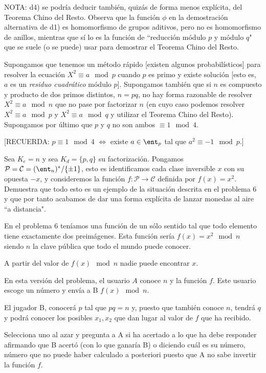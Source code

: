 \begin{problem}[7]
NOTA: d4) se podría deducir también, quizás de forma menos explícita, del Teorema Chino del Resto. Observa que la función $\phi$ en la demostración alternativa de d1) es homomorfismo de grupos aditivos, pero no es homomorfismo de anillos, mientras que sí lo es la función de ``reducción módulo $p$ y módulo $q$" que se suele (o se puede) usar para demostrar  el Teorema Chino del Resto.
\end{problem}

\begin{problem}[8]
Supongamos que tenemos un método rápido [existen algunos
probabilísticos] para resolver la ecuación   $X^2\equiv a \mod p$
cuando $p$ es primo y existe solución [esto es, $a$ es un {\it
residuo cuadrático} módulo $p$]. Supongamos también que si $n$ es
compuesto y producto de dos primos distintos, $n=pq$, no hay forma
razonable de resolver   $X^2\equiv a \mod n$ que no pase por
factorizar $n$ (en cuyo caso podemos resolver $X^2\equiv a \mod p$
y $X^2\equiv a \mod q$ y utilizar el Teorema Chino del Resto).
Supongamos por último que $p$ y $q$ no son ambos $\equiv 1 \mod
4$.

[RECUERDA: $p\equiv 1 \mod
4$ $\iff$ existe $a\in \ent_p$ tal que $a^2\equiv -1 \mod p$.]

Sea $K_e=n$ y sea $K_d=\{p,q\}$ su factorización. Pongamos $
\mathcal{P}= \mathcal{ C}=(\ent_n)^*/\{\pm 1\}$, esto es
identificamos cada clase inversible $x$ con su opuesta $-x$, y
consideremos la función $f:  \mathcal{P}\to  \mathcal{C}$ definida
por $f(x)=x^2$. Demuestra que todo esto es un ejemplo de la
situación descrita  en el problema 6 y que por tanto acabamos de
dar una forma explícita de lanzar monedas al aire ``a distancia".
\solution


En el problema 6 teníamos una función de un sólo sentido tal que todo elemento tiene exactamente dos preimágenes. Esta función sería $f(x)=x^2 \mod n$ siendo $n$ la clave pública que todo el mundo puede conocer.

A partir del valor de $f(x) \mod n$ nadie puede encontrar $x$.

En esta versión del problema, el usuario $A$ conoce $n$ y la función $f$. Este usuario escoge un número y envía a B $f(x)\mod n$.

El jugador B, conocerá $p$ tal que $pq=n$ y, puesto que también conoce $n$, tendrá $q$ y podrá conocer los posibles $x_1,x_2$ que dan lugar al valor de $f$ que ha recibido.

Selecciona uno al azar y pregunta a A si ha acertado a lo que ha debe responder afirmando que B acertó (con lo que ganaría B) o diciendo cuál es su número, número que no puede haber calculado a posteriori puesto que A no sabe invertir la función $f$.


\end{problem}
